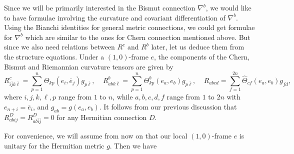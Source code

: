 \documentclass{amsart}
\numberwithin{equation}{section}
\theoremstyle{definition}
\renewcommand{\1}{\mathds{1}}
\renewcommand{\>}{\rightarrow}
\begin{document}



Since we will be primarily interested in the Bismut connection $\nabla^b$, we would like to have formulae involving the curvature and covariant differentiation of $\nabla^b$. Using the Bianchi identities for general metric connections, we could get formulae for $\nabla^b$ which are similar to the ones for Chern connection mentioned above. But since we also need relations between $R^c$ and $R^b$ later, let us deduce them from the structure equations. Under a $(1,0)$-frame $e$, the components of the Chern, Bismut and Riemannian curvature tensors are given by
\begin{equation*}
R^c_{i\overline{j}k\overline{\ell}}  =  \sum_{p=1}^n \Theta_{kp}(e_i,
\overline{e}_j)g_{p\overline{\ell}}, \ \ \  \ \ R^b_{abk\overline{\ell}}  =  \sum_{p=1}^n \Theta^b_{kp}(e_a,
e_b)g_{p\overline{\ell}}, \ \ \ \ \ R_{abcd} = \sum_{f=1}^{2n} \hat{\Theta}_{cf}(e_a,e_b)g_{fd},
\end{equation*}
where $i,j,k,\ell,p$ range from $1$ to $n$, while $a,b,c,d,f$ range from $1$ to $2n$ with
$e_{n+i}=\overline{e}_i$, and $g_{ab}=g(e_a,e_b)$. It follows from our previous discussion that $R^D_{abij} = R^D_{ab\bar{i}\bar{j}} =0$ for any Hermitian connection $D$.

For convenience, we will assume from now on that our local $(1,0)$-frame $e$ is unitary for the Hermitian metric $g$. Then we have
\end{document}
